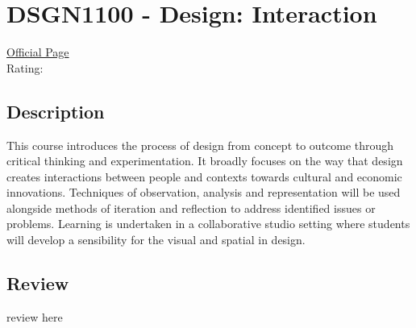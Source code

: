 \hypertarget{DSGN1100}{\section{DSGN1100 - Design: Interaction}}

\large
\textcolor{turbo_purple}{\href{https://my.uq.edu.au/programs-courses/course.html?course_code=DSGN1100}{Official Page}} \\
Rating: \cstar\cstar\cstar\cstar\ostar

\normalsize
\subsection*{Description}
This course introduces the process of design from concept to outcome through critical thinking and experimentation.
It broadly focuses on the way that design creates interactions between people and contexts towards cultural and economic innovations.
Techniques of observation, analysis and representation will be used alongside methods of iteration and reflection to address identified issues or problems.
Learning is undertaken in a collaborative studio setting where students will develop a sensibility for the visual and spatial in design.

\subsection*{Review}
review here
